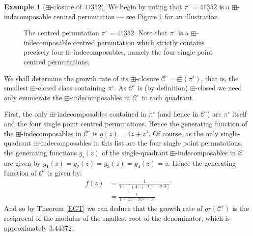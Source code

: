 \documentclass[11pt,a4paper]{article}
\newcommand{\plotptradius}{4pt}
\theoremstyle{definition}
\newtheorem{example}[thm]{Example}
\begin{document}
\begin{example}[$\boxplus$-closure of $41\underline{3}52$]
We begin by noting that $\pi^{\circ} = 41\underline{3}52$ is a $\boxplus$-indecomposable centred permutation --- see Figure \ref{fig:pi41352} for an illustration.

\begin{figure}[h]
\begin{center}
\end{center}
\caption{The centred permutation $\pi^{\circ} = 41\underline{3}52$. Note that $\pi^{\circ}$ is a $\boxplus$-indecomposable centred permutation which strictly contains precisely four $\boxplus$-indecomposables, namely the four single point centred permutations.}
\label{fig:pi41352}
\end{figure}

 We shall determine the growth rate of its $\boxplus$-closure $\mathcal{C}^{\circ} = \boxplus(\pi^{\circ})$, that is, the smallest $\boxplus$-closed class containing $\pi^{\circ}$. As $\mathcal{C}^{\circ}$ is (by definition) $\boxplus$-closed we need only enumerate the $\boxplus$-indecomposables in $\mathcal{C}^{\circ}$ in each quadrant.

First, the only $\boxplus$-indecomposables contained in $\pi^{\circ}$ (and hence in $\mathcal{C}^{\circ}$) are $\pi^{\circ}$ itself and the four single point centred permutations. Hence the generating function of the $\boxplus$-indecomposables in $\mathcal{C}^{\circ}$ is $g(z) = 4z + z^4$. Of course, as the only single-quadrant $\boxplus$-indecomposables in this list are the four single point permutations, the generating functions $g_{i}(z)$ of the single-quadrant $\boxplus$-indecomposables in $\mathcal{C}^{\circ}$ are given by $g_{1}(z) = g_{2}(z) = g_{3}(z) = g_{4}(z) = z$. Hence the generating function of $\mathcal{C}^{\circ}$ is given by:
\[
\begin{split}
f(z) & = \frac{1}{1 - [(4z + z^4) -  2z^2]} \\
 & = \frac{1}{1 - 4z + 2z^2 - z^4}
\end{split}
\]
And so by Theorem \ref{EGT} we can deduce that the growth rate of $gr(\mathcal{C}^{\circ})$ is the reciprocal of the modulus of the smallest root of the denominator, which is approximately $3.44372$.
\end{example}
\end{document}
